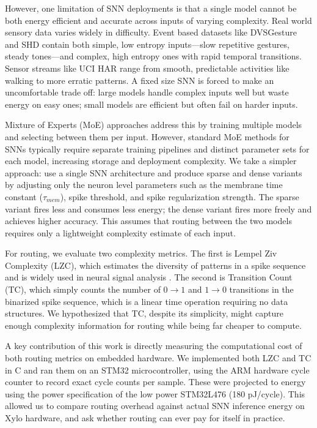 \documentclass[conference]{IEEEtran}
\begin{document}
However, one limitation of SNN deployments is that a single model cannot be both energy efficient and accurate across inputs of varying complexity. Real world sensory data varies widely in difficulty. Event based datasets like DVSGesture and SHD contain both simple, low entropy inputs—slow repetitive gestures, steady tones—and complex, high entropy ones with rapid temporal transitions. Sensor streams like UCI HAR range from smooth, predictable activities like walking to more erratic patterns. A fixed size SNN is forced to make an uncomfortable trade off: large models handle complex inputs well but waste energy on easy ones; small models are efficient but often fail on harder inputs.

Mixture of Experts (MoE) approaches address this by training multiple models and selecting between them per input. However, standard MoE methods for SNNs typically require separate training pipelines and distinct parameter sets for each model, increasing storage and deployment complexity. We take a simpler approach: use a single SNN architecture and produce sparse and dense variants by adjusting only the neuron level parameters such as the membrane time constant ($\tau_{mem}$), spike threshold, and spike regularization strength. The sparse variant fires less and consumes less energy; the dense variant fires more freely and achieves higher accuracy. This assumes that routing between the two models requires only a lightweight complexity estimate of each input.

For routing, we evaluate two complexity metrics. The first is Lempel Ziv Complexity (LZC), which estimates the diversity of patterns in a spike sequence and is widely used in neural signal analysis \cite{amigo2004entropySNN}. The second is Transition Count (TC), which simply counts the number of $0{\to}1$ and $1{\to}0$ transitions in the binarized spike sequence, which is a linear time operation requiring no data structures. We hypothesized that TC, despite its simplicity, might capture enough complexity information for routing while being far cheaper to compute.

A key contribution of this work is directly measuring the computational cost of both routing metrics on embedded hardware. We implemented both LZC and TC in C and ran them on an STM32 microcontroller, using the ARM hardware cycle counter to record exact cycle counts per sample. These were projected to energy using the power specification of the low power STM32L476 (180 pJ/cycle). This allowed us to compare routing overhead against actual SNN inference energy on Xylo hardware, and ask whether routing can ever pay for itself in practice.
\end{document}
